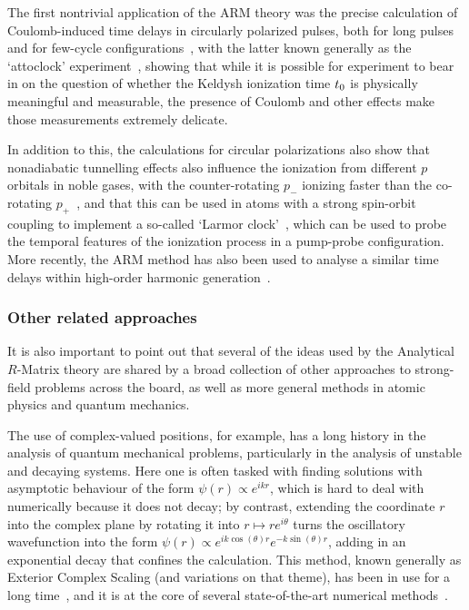 The first nontrivial application of the ARM theory was the precise calculation of Coulomb-induced time delays in circularly polarized pulses, both for long pulses~\cite{ ARM_circular, ARM_trajectories} and for few-cycle configurations~\cite{ARM_attoclock}, with the latter known generally as the `attoclock' experiment~\cite{ pfeiffer_attoclock_2012}, showing that while it is possible for experiment to bear in on the question of whether the Keldysh ionization time ${t_0}$ is physically meaningful and measurable, the presence of Coulomb and other effects make those measurements extremely delicate. 

In addition to this, the calculations for circular polarizations also show that nonadiabatic tunnelling effects also influence the ionization from different $p$ orbitals in noble gases, with the counter-rotating $p_-$ ionizing faster than the co-rotating $p_+$~\cite{ARM_circular}, and that this can be used in atoms with a strong spin-orbit coupling to implement a so-called `Larmor clock'~\cite{ARM_spin-orbit, ARM_ring-currents}, which can be used to probe the temporal features of the ionization process in a pump-probe configuration. More recently, the ARM method has also been used to analyse a similar time delays within high-order harmonic generation~\cite{ ARM_Coulomb_HHG}.












\subsubsection{Other related approaches}
It is also important to point out that several of the ideas used by the Analytical $R$-Matrix theory are shared by a broad collection of other approaches to strong-field problems across the board, as well as more general methods in atomic physics and quantum mechanics.

The use of complex-valued positions, for example, has a long history in the analysis of quantum mechanical problems, particularly in the analysis of unstable and decaying systems. Here one is often tasked with finding solutions with asymptotic behaviour of the form $\psi(r)\propto e^{i kr}$, which is hard to deal with numerically because it does not decay; by contrast, extending the coordinate $r$ into the complex plane by rotating it into $r\mapsto re^{i\theta}$ turns the oscillatory wavefunction into the form $\psi(r) \propto e^{ik\cos(\theta)r} e^{-k\sin(\theta)r}$, adding in an exponential decay that confines the calculation. This method, known generally as Exterior Complex Scaling (and variations on that theme), has been in use for a long time~\cite{reinhardt_complex-coords_1982}, and it is at the core of several state-of-the-art numerical methods~\cite{scrinzi_TDSE_chapter, scrinzi_tsurff_2012}. 

